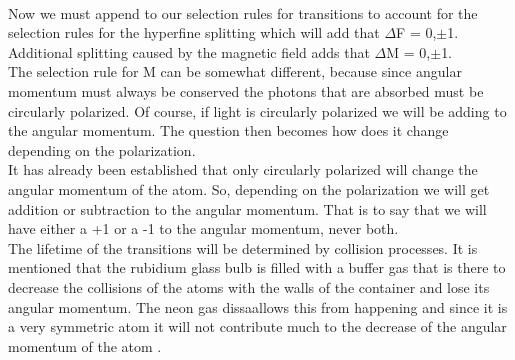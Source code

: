 \documentclass[twocolumn]{article}
\begin{document}
\\
Now we must append to our selection rules for transitions to account for the 
selection rules for the hyperfine splitting which will add that $\Delta$F = 
0,$\pm$1. Additional splitting caused by the magnetic field adds that $\Delta$M 
= 0,$\pm$1.
\\
The selection rule for M can be somewhat different, because since angular 
momentum must always be conserved the photons that are absorbed  must be circularly 
polarized. Of course, if light is circularly polarized we will be adding to 
the angular momentum. The question then becomes how does it change depending on 
the polarization.
\\
It has already been established that only circularly polarized will change the 
angular momentum of the atom. So, depending on the polarization we will get 
addition or subtraction to the angular momentum. That is to say that we will 
have either a +1 or a -1 to the angular momentum, never both.
\\
The lifetime of the transitions will be determined by collision processes. 
It is mentioned that the rubidium glass bulb is filled with a buffer gas that 
is there to decrease the collisions of the atoms with the walls of the 
container and lose its angular momentum. The neon gas dissaallows this from 
happening and since it is a very symmetric atom it will not contribute much to 
the decrease of the angular momentum of the atom \cite{ref:1}.
\end{document}
